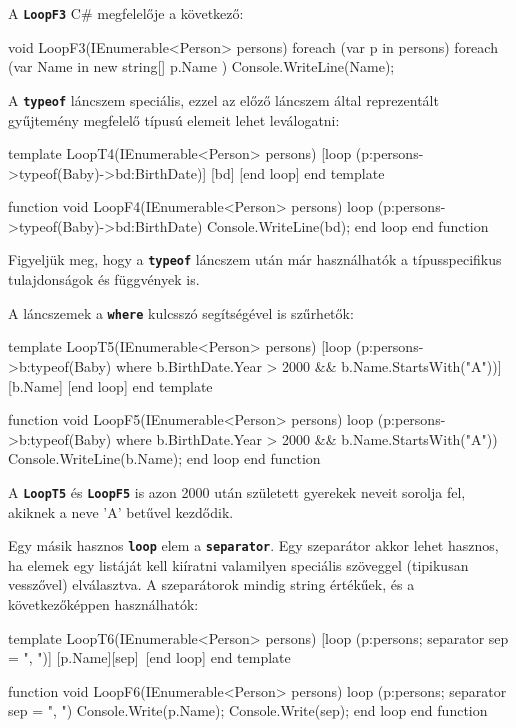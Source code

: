 \documentclass[12pt, a4paper]{report}
\newcommand{\ff}[1]{\textbf{\texttt{#1}}}
\begin{document}
A \ff{LoopF3} C\# megfelelője a következő:

\begin{csharpcode}
void LoopF3(IEnumerable<Person> persons)
{
	foreach (var p in persons)
	{
		foreach (var Name in new string[] { p.Name })
		{
			Console.WriteLine(Name);
		}
	}
}
\end{csharpcode}

A \ff{typeof} láncszem speciális, ezzel az előző láncszem által reprezentált gyűjtemény megfelelő típusú elemeit lehet leválogatni:

\begin{mgencode}
template LoopT4(IEnumerable<Person> persons)
  [loop (p:persons->typeof(Baby)->bd:BirthDate)]
[bd]
  [end loop]
end template

function void LoopF4(IEnumerable<Person> persons)
  loop (p:persons->typeof(Baby)->bd:BirthDate)
Console.WriteLine(bd);
  end loop
end function
\end{mgencode}

Figyeljük meg, hogy a \ff{typeof} láncszem után már használhatók a típusspecifikus tulajdonságok és függvények is.

A láncszemek a \ff{where} kulcsszó segítségével is szűrhetők:

\begin{mgencode}
template LoopT5(IEnumerable<Person> persons)
  [loop (p:persons->b:typeof(Baby) where b.BirthDate.Year > 2000 && b.Name.StartsWith("A"))]
[b.Name]
  [end loop]
end template

function void LoopF5(IEnumerable<Person> persons)
  loop (p:persons->b:typeof(Baby) where b.BirthDate.Year > 2000 && b.Name.StartsWith("A"))
    Console.WriteLine(b.Name);
  end loop
end function
\end{mgencode}

A \ff{LoopT5} és \ff{LoopF5} is azon 2000 után született gyerekek neveit sorolja fel, akiknek a neve 'A' betűvel kezdődik.

Egy másik hasznos \ff{loop} elem a \ff{separator}. Egy szeparátor akkor lehet hasznos, ha elemek egy listáját kell kiíratni valamilyen speciális szöveggel (tipikusan vesszővel) elválasztva. A szeparátorok mindig string értékűek, és a következőképpen használhatók:

\begin{mgencode}
template LoopT6(IEnumerable<Person> persons)
  [loop (p:persons; separator sep = ", ")]
[p.Name][sep]\
  [end loop]
end template

function void LoopF6(IEnumerable<Person> persons)
  loop (p:persons; separator sep = ", ")
    Console.Write(p.Name);
    Console.Write(sep);
  end loop
end function
\end{mgencode}
\end{document}

